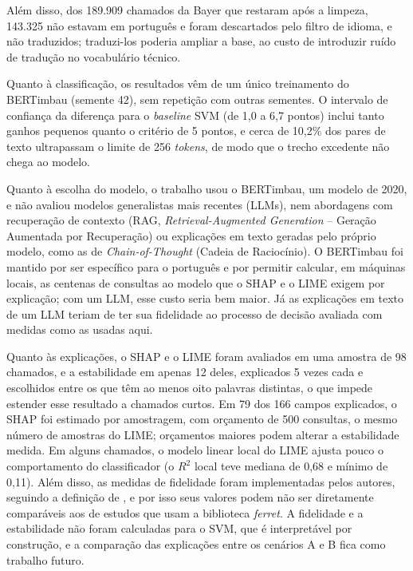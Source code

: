 \documentclass[
    12pt,                %
    openright,           %
    oneside,             %
    a4paper,             %
    english,             %
    brazil               %
]{abntex2}
\begin{document}
Além disso, dos 189.909 chamados da Bayer que restaram após a limpeza, 143.325 não estavam em português e foram descartados pelo filtro de idioma, e não traduzidos; traduzi-los poderia ampliar a base, ao custo de introduzir ruído de tradução no vocabulário técnico.

Quanto à classificação, os resultados vêm de um único treinamento do BERTimbau (semente 42), sem repetição com outras sementes. O intervalo de confiança da diferença para o \textit{baseline} SVM (de 1,0 a 6,7 pontos) inclui tanto ganhos pequenos quanto o critério de 5 pontos, e cerca de 10,2\% dos pares de texto ultrapassam o limite de 256 \textit{tokens}, de modo que o trecho excedente não chega ao modelo.

Quanto à escolha do modelo, o trabalho usou o BERTimbau, um modelo de 2020, e não avaliou modelos generalistas mais recentes (LLMs), nem abordagens com recuperação de contexto (RAG, \textit{Retrieval-Augmented Generation} -- Geração Aumentada por Recuperação) ou explicações em texto geradas pelo próprio modelo, como as de \textit{Chain-of-Thought} (Cadeia de Raciocínio). O BERTimbau foi mantido por ser específico para o português e por permitir calcular, em máquinas locais, as centenas de consultas ao modelo que o SHAP e o LIME exigem por explicação; com um LLM, esse custo seria bem maior. Já as explicações em texto de um LLM teriam de ter sua fidelidade ao processo de decisão avaliada com medidas como as usadas aqui.

Quanto às explicações, o SHAP e o LIME foram avaliados em uma amostra de 98 chamados, e a estabilidade em apenas 12 deles, explicados 5 vezes cada e escolhidos entre os que têm ao menos oito palavras distintas, o que impede estender esse resultado a chamados curtos. Em 79 dos 166 campos explicados, o SHAP foi estimado por amostragem, com orçamento de 500 consultas, o mesmo número de amostras do LIME; orçamentos maiores podem alterar a estabilidade medida. Em alguns chamados, o modelo linear local do LIME ajusta pouco o comportamento do classificador (o $R^2$ local teve mediana de 0,68 e mínimo de 0,11). Além disso, as medidas de fidelidade foram implementadas pelos autores, seguindo a definição de , e por isso seus valores podem não ser diretamente comparáveis aos de estudos que usam a biblioteca \textit{ferret}.  A fidelidade e a estabilidade não foram calculadas para o SVM, que é interpretável por construção, e a comparação das explicações entre os cenários A e B fica como trabalho futuro.
\end{document}
